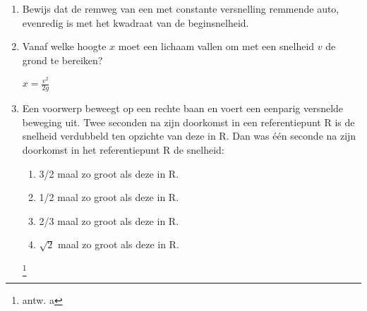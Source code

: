 \begin{enumerate}
\item Bewijs dat de remweg van een met constante versnelling remmende auto, evenredig is met het kwadraat van de beginsnelheid.

\item Vanaf welke hoogte $x$ moet een lichaam vallen om met een snelheid $v$ de grond te bereiken?

\begin{oplossing}
	$x=\frac{v^2}{2g}$
\end{oplossing}



\item Een voorwerp beweegt op een rechte baan en
voert een eenparig versnelde beweging uit. Twee seconden na zijn
doorkomst in een referentiepunt R is de snelheid verdubbeld ten
opzichte van deze in R.
\newline
\newline
Dan was \'e\'en seconde na zijn doorkomst in het referentiepunt R de
snelheid:
\begin{enumerate}
\item 3/2 maal zo groot als deze in R.
\item 1/2 maal zo groot als deze in R.
\item 2/3 maal zo groot als deze in R.
\item $\sqrt{2}$ maal zo groot als deze in R.
\end{enumerate}
\footnote{antw. a}



\end{enumerate}


